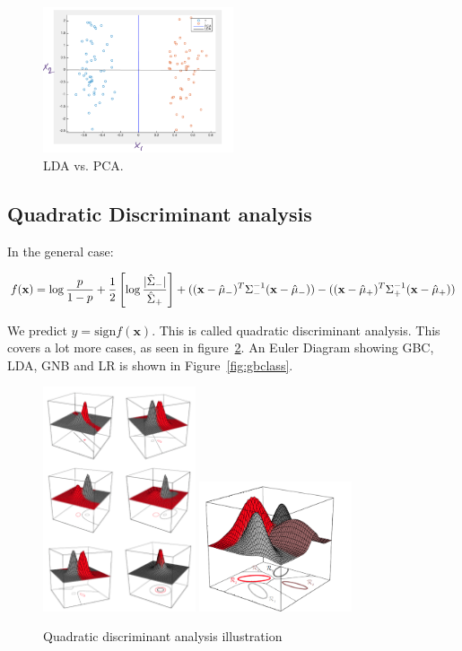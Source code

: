 \documentclass[a4paper,10pt,twoside]{article}
\begin{document}
\begin{figure}
  \centering
  \includegraphics[width=0.5\textwidth]{figures/lda-vs-pca.png}
  \caption{LDA vs. PCA.}
  \label{fig:lda-vs-pca}
\end{figure}

\subsection{Quadratic Discriminant analysis}

In the general case:

\begin{equation*}
  f(\mathbf{x})=\log{p\over 1-p}+{1\over 2}\left[\log{|\hat{\Sigma}_-|\over \hat{\Sigma}_+}\right]+((\mathbf{x}-\hat{\mu}_-)^T\Sigma_-^{-1}(\mathbf{x}-\hat{\mu}_-))-((\mathbf{x}-\hat{\mu}_+)^T\Sigma_+ ^{-1}(\mathbf{x}-\hat{\mu}_ +))
\end{equation*}

We predict $y=\text{sign}f(\mathbf{x})$. This is called quadratic discriminant analysis. This covers a lot more cases, as seen in figure~\ref{fig:qda}. An Euler Diagram showing GBC, LDA, GNB and LR is shown in Figure~\ref{fig:gbclass}.

\begin{figure}
  \centering
  \includegraphics[width=0.4\textwidth]{figures/qda.png}
  \hfill
  \includegraphics[width=0.4\textwidth]{figures/qda_mutliple_classes.png}
  \caption{Quadratic discriminant analysis illustration }
\label{fig:qda}
\end{figure}
\end{document}
